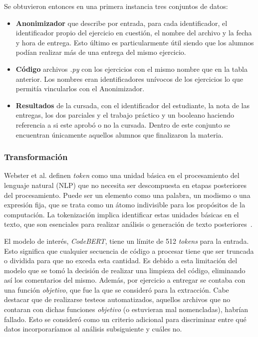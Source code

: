 \documentclass[11pt,a4paper,twoside,openany]{tesis}
\begin{document}
Se obtuvieron entonces en una primera instancia tres conjuntos de datos: 
\begin{itemize}
    \item \textbf{Anonimizador} que describe por entrada, para cada identificador, el identificador propio del ejercicio en cuestión, el nombre del archivo y la fecha y hora de entrega. Esto último es particularmente útil siendo que los alumnos podían realizar más de una entrega del mismo ejercicio.
    \item \textbf{Código} archivos \emph{.py} con los ejercicios con el mismo nombre que en la tabla anterior. Los nombres eran identificadores unívocos de los ejercicios lo que permitía vincularlos con el Anonimizador.
    \item \textbf{Resultados} de la cursada, con el identificador del estudiante, la nota de las entregas, los dos parciales y el trabajo práctico y un booleano haciendo referencia a si este aprobó o no la cursada. Dentro de este conjunto se encuentran únicamente aquellos alumnos que finalizaron la materia.  
\end{itemize} 

\subsubsection{Transformación}\textbf{ }

Webster et al. definen \emph{token} como una unidad básica en el procesamiento del lenguaje natural (NLP) que no necesita ser descompuesta en etapas posteriores del procesamiento. Puede ser un elemento como una palabra, un modismo o una expresión fija, que se trata como un átomo indivisible para los propósitos de la computación. La tokenización implica identificar estas unidades básicas en el texto, que son esenciales para realizar análisis o generación de texto posteriores~\cite{tokens}.

El modelo de interés, \emph{CodeBERT}, tiene un límite de 512 \emph{tokens} para la entrada. Esto significa que cualquier secuencia de código a procesar tiene que ser truncada o dividida para que no exceda esta cantidad. Es debido a esta limitación del modelo que se tomó la decisión de realizar una limpieza del código, eliminando así los comentarios del mismo. Además, por ejercicio a entregar se contaba con una función \emph{objetivo}, que fue la que se consideró para la extracción. Cabe destacar que de realizarse testeos automatizados, aquellos archivos que no contaran con dichas funciones \emph{objetivo} (o estuvieran mal nomencladas), habrían fallado. Esto se consideró como un criterio adicional para discriminar entre qué datos incorporaríamos al análisis subsiguiente y cuáles no. 
\end{document}
